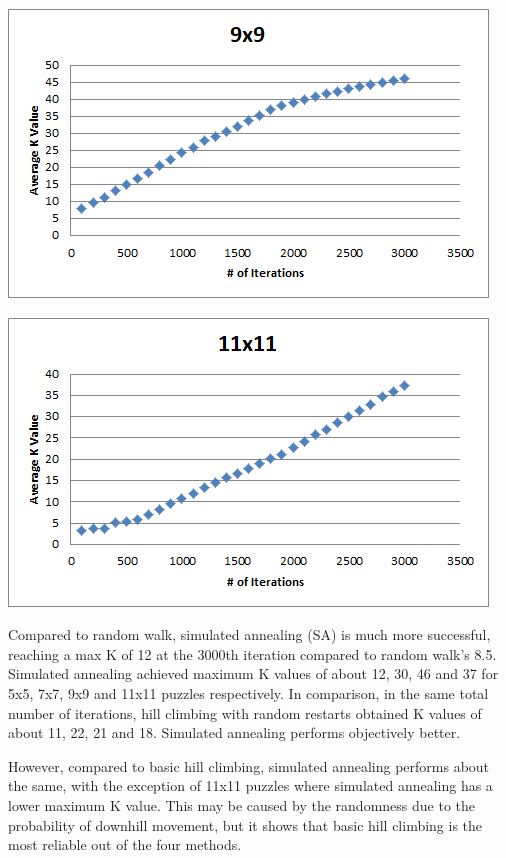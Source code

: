 \documentclass[12pt, letterpaper]{article}
\begin{document}
\bigskip

\includegraphics[width=\linewidth]{"Task 6/9x9 Scatterplot"}

\bigskip

\includegraphics[width=\linewidth]{"Task 6/11x11 Scatterplot"}

\bigskip

Compared to random walk, simulated annealing (SA) is much more successful, reaching a max K of 12 at the 3000th iteration compared to random walk's 8.5. Simulated annealing achieved maximum K values of about 12, 30, 46 and 37 for 5x5, 7x7, 9x9 and 11x11 puzzles respectively. In comparison, in the same total number of iterations, hill climbing with random restarts obtained K values of about 11, 22, 21 and 18. Simulated annealing performs objectively better. 

However, compared to basic hill climbing, simulated annealing performs about the same, with the exception of 11x11 puzzles where simulated annealing has a lower maximum K value. This may be caused by the randomness due to the probability of downhill movement, but it shows that basic hill climbing is the most reliable out of the four methods.
\end{document}
